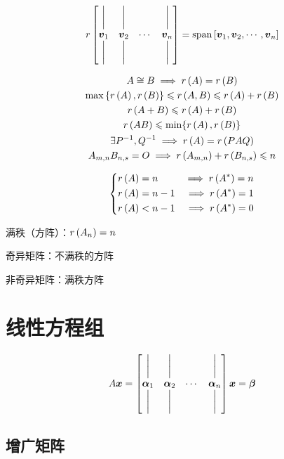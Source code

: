 \documentclass{article}
\begin{document}
\begin{definition}
    \[r\begin{bmatrix}
            \bigg| & \bigg| &        & \bigg| \\
            \boldsymbol v_1   & \boldsymbol v_2   & \cdots & \boldsymbol v_n   \\
            \bigg| & \bigg| &        & \bigg|
        \end{bmatrix}
        =\mathrm{span}\left[\boldsymbol v_1,\boldsymbol v_2,\cdots,\boldsymbol v_n\right]\]
\end{definition}

\[\begin{gathered}
        A\cong B\implies r\left(A\right)=r\left(B\right)\\
        \max\left\{r\left(A\right),r\left(B\right)\right\}\leqslant r\left(A,B\right)\leqslant r\left(A\right)+r\left(B\right)\\
        r\left(A+B\right)\leqslant r\left(A\right)+r\left(B\right)\\
        r\left(AB\right)\leqslant\min\{r\left(A\right),r\left(B\right)\}\\
        \exists P^{-1},Q^{-1}\implies r\left(A\right)=r\left(PAQ\right)\\
        A_{m,n}B_{n,s}=O\implies r\left(A_{m,n}\right)+r\left(B_{n,s}\right)\leqslant n
    \end{gathered}\]

\[\left\{\begin{aligned}
        r\left(A\right) & =n   & \implies r\left(A^*\right)=n \\
        r\left(A\right) & =n-1 & \implies r\left(A^*\right)=1 \\
        r\left(A\right) & <n-1 & \implies r\left(A^*\right)=0
    \end{aligned}\right.\]

满秩（方阵）：$r\left(A_n\right)=n$

奇异矩阵：不满秩的方阵

非奇异矩阵：满秩方阵

\section{线性方程组}

\[\def\av{\boldsymbol{\mathrm\alpha}}
    A\boldsymbol x=
    \begin{bmatrix}
        \bigg| & \bigg| &        & \bigg| \\
        \av_1  & \av_2  & \cdots & \av_n  \\
        \bigg| & \bigg| &        & \bigg|
    \end{bmatrix}\boldsymbol x=
    \boldsymbol\beta\]

\subsection{增广矩阵}
\end{document}

